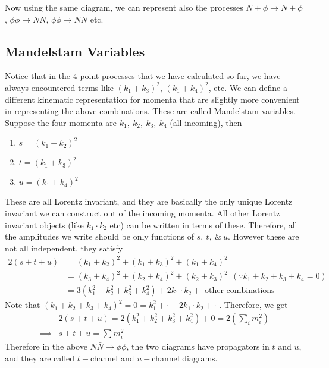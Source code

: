 \documentclass[11pt]{article}
\numberwithin{equation}{section}
\begin{document}
    Now using the same diagram, we can represent also the processes \(N+\phi \to N + \phi\), \(\phi\phi\to N N\), \(\phi\phi\to \bar N \bar N\) etc.

    \subsection{Mandelstam Variables}
    Notice that in the 4 point processes that we have calculated so far, we have always encountered terms like \((k_1 + k_3)^2\), \((k_1 + k_4)^2\), etc. We can define a different kinematic representation for momenta that are slightly more convenient in representing the above combinations. These are called Mandelstam variables.\\

    Suppose the four momenta are \(k_1,~k_2,~k_3,~k_4\) (all incoming), then 
    \begin{enumerate}
        \item \(s = (k_1 + k_2)^2\)
        \item \(t = (k_1 + k_3)^2\)
        \item \(u = (k_1 + k_4)^2\)
    \end{enumerate}

    These are all Lorentz invariant, and they are basically the only unique Lorentz invariant we can construct out of the incoming momenta. All other Lorentz invariant objects (like \(k_1\cdot k_2\) etc) can be written in terms of these. Therefore, all the amplitudes we write should be only functions of \(s,~t,~\& ~u\). However these are not all independent, they satisfy 
    \begin{align*}
        2(s+t+u) &= (k_1 + k_2)^2 + (k_1 + k_3)^2 + (k_1 + k_4)^2\\
            &=(k_3 + k_4)^2 + (k_2 + k_4)^2 + (k_2 + k_3)^2~~(\because k_1 + k_2 + k_3 + k_4 = 0)\\
            &= 3(k_1^2 + k_2^2 + k_3^2 + k_4^2 ) + 2k_1\cdot k_2 + \text{~other combinations}
    \end{align*}
    Note that \((k_1 + k_2 + k_3 + k_4)^2  = 0 = k_1^2 +\cdot+2k_1 \cdot k_2 + \cdot \) . Therefore, we get 
    \begin{align*}
        &2(s+t+u) = 2(k_1^2 + k_2^2 + k_3^2 + k_4^2) + 0 = 2(\sum_i m_i^2)\\
        \implies & s+t+u = \sum m_i^2
    \end{align*}
    Therefore in the above \(N\bar N \to \phi\phi\), the two diagrams have propagators in \(t\) and \(u\), and they are called \(t-\)channel and \(u-\)channel diagrams.\\
\end{document}
